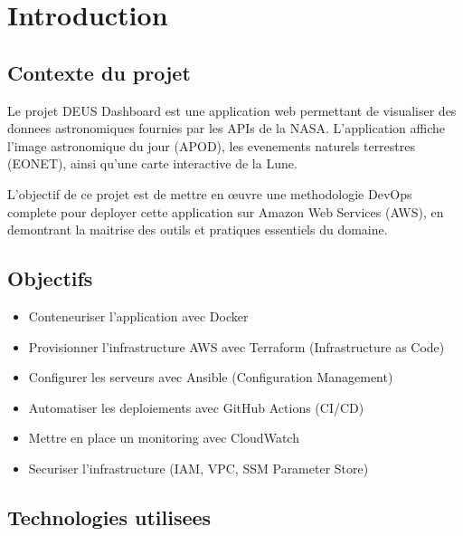 \chapter{Introduction}

\section{Contexte du projet}

Le projet DEUS Dashboard est une application web permettant de visualiser des donnees
astronomiques fournies par les APIs de la NASA. L'application affiche l'image astronomique
du jour (APOD), les evenements naturels terrestres (EONET), ainsi qu'une carte interactive
de la Lune.

L'objectif de ce projet est de mettre en \oe{}uvre une methodologie DevOps complete
pour deployer cette application sur Amazon Web Services (AWS), en demontrant la maitrise
des outils et pratiques essentiels du domaine.

\section{Objectifs}

\begin{itemize}
    \item Conteneuriser l'application avec Docker
    \item Provisionner l'infrastructure AWS avec Terraform (Infrastructure as Code)
    \item Configurer les serveurs avec Ansible (Configuration Management)
    \item Automatiser les deploiements avec GitHub Actions (CI/CD)
    \item Mettre en place un monitoring avec CloudWatch
    \item Securiser l'infrastructure (IAM, VPC, SSM Parameter Store)
\end{itemize}

\section{Technologies utilisees}

